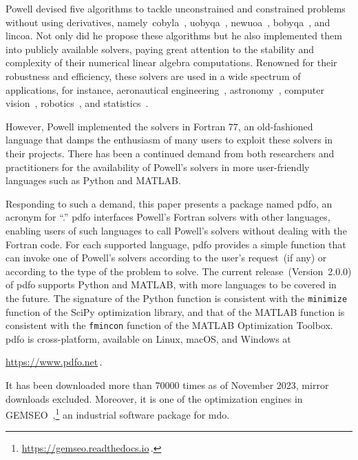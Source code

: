 \documentclass[
    smallextended,  %
    final,          %
]{svjour3}
\newcommand{\modified}[1]{\texorpdfstring{{\color{RoyalBlue}#1}}{#1}}
\begin{document}
Powell devised five algorithms to tackle unconstrained and constrained problems without using derivatives, namely~\gls{cobyla}~\cite{Powell_1994}, \gls{uobyqa}~\cite{Powell_2002}, \gls{newuoa}~\cite{Powell_2006}, \gls{bobyqa}~\cite{Powell_2009}, and \gls{lincoa}.
\modified{Not only did he} propose these algorithms but \modified{he} also implemented them into publicly available solvers, paying great attention to the stability and complexity of their numerical linear algebra computations.
Renowned for their robustness and efficiency, these solvers are used in a wide spectrum of applications, for instance, aeronautical engineering~\cite{Gallard_Etal_2018}, astronomy~\cite{Mamon_Biviano_Boue_2013}, computer vision~\cite{Izadinia_Shan_Seitz_2017}, robotics~\cite{Mombaur_Truong_Laumond_2010}, and statistics~\cite{Bates_Etal_2015}.

However, Powell \modified{implemented} the solvers in Fortran 77, an \modified{old-fashioned} language that damps the enthusiasm of many users to exploit these solvers in their projects.
There has been a continued demand from both researchers and practitioners for the availability of Powell's solvers in more user-friendly languages such as Python and MATLAB.

Responding to such a demand, this paper presents a package named \gls{pdfo}, an acronym for ``.''
\Gls{pdfo} interfaces Powell's Fortran solvers with other languages, enabling users of such languages to call Powell's solvers without dealing with the Fortran code.
For each supported language, \gls{pdfo} provides a simple function that can invoke one of Powell's solvers according to the user's request~(if any) or according to the type of the problem to solve.
The current release~(Version~\modified{2.0.0}) of \gls{pdfo} supports Python and MATLAB, with more languages to be covered in the future.
The signature of the Python function is consistent with the \texttt{minimize} function of the SciPy optimization library, and that of the MATLAB function is consistent with the \texttt{fmincon} function of the MATLAB Optimization Toolbox.
\Gls{pdfo} is cross-platform, available on Linux, macOS, and Windows at
\begin{center}
    \url{https://www.pdfo.net}\,.
\end{center}
It has been downloaded more than \modified{\num{70000}} times as of \modified{November} 2023, mirror downloads excluded.
Moreover, it is one of the optimization engines in GEMSEO~\cite{Gallard_Etal_2018},\footnote{\url{https://gemseo.readthedocs.io}\,.} an industrial software package for \gls{mdo}.
\end{document}
